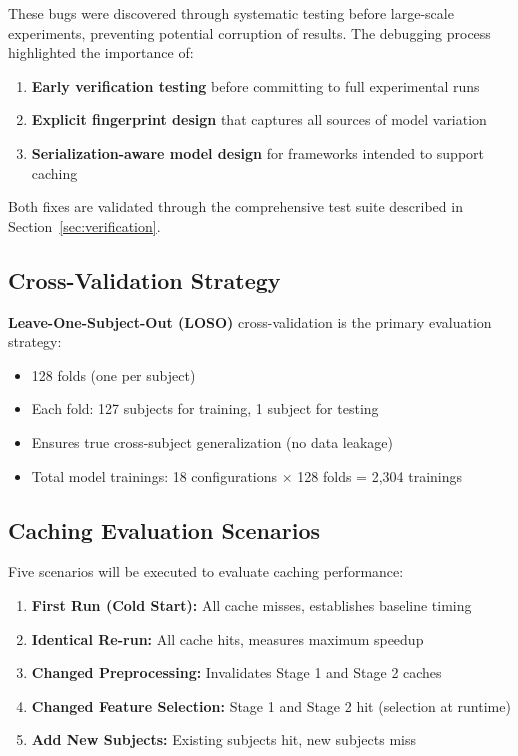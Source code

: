 \documentclass{imc-inf} %
\begin{document}
These bugs were discovered through systematic testing before large-scale 
experiments, preventing potential corruption of results. The debugging process 
highlighted the importance of:
\begin{enumerate}
\item \textbf{Early verification testing} before committing to full experimental runs
\item \textbf{Explicit fingerprint design} that captures all sources of model variation
\item \textbf{Serialization-aware model design} for frameworks intended to support caching
\end{enumerate}

Both fixes are validated through the comprehensive test suite described in 
Section~\ref{sec:verification}.

\subsection{Cross-Validation Strategy}

\textbf{Leave-One-Subject-Out (LOSO)} cross-validation is the primary evaluation strategy:
\begin{itemize}
\item 128 folds (one per subject)
\item Each fold: 127 subjects for training, 1 subject for testing
\item Ensures true cross-subject generalization (no data leakage)
\item Total model trainings: 18 configurations $\times$ 128 folds = 2,304 trainings
\end{itemize}

\subsection{Caching Evaluation Scenarios}

Five scenarios will be executed to evaluate caching performance:

\begin{enumerate}
\item \textbf{First Run (Cold Start):} All cache misses, establishes baseline timing
\item \textbf{Identical Re-run:} All cache hits, measures maximum speedup
\item \textbf{Changed Preprocessing:} Invalidates Stage 1 and Stage 2 caches
\item \textbf{Changed Feature Selection:} Stage 1 and Stage 2 hit (selection at runtime)
\item \textbf{Add New Subjects:} Existing subjects hit, new subjects miss
\end{enumerate}
\end{document}
